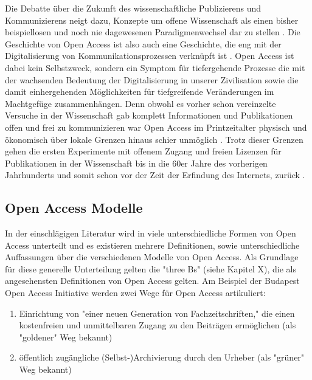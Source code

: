 Die Debatte über die Zukunft des wissenschaftliche Publizierens und Kommunizierens neigt dazu, Konzepte um offene Wissenschaft als einen bisher beispiellosen und noch nie dagewesenen Paradigmenwechsel dar zu stellen \cite{cite:17a} \cite{cite:17b}. Die Geschichte von Open Access ist also auch eine Geschichte, die eng mit der Digitalisierung von Kommunikationsprozessen verknüpft ist \cite{albert_2006_open_implications}. Open Access ist dabei kein Selbstzweck\cite{cite:17d}, sondern ein Symptom für tiefergehende Prozesse die mit der wachsenden Bedeutung der Digitalisierung in unserer Zivilisation sowie die damit einhergehenden Möglichkeiten für tiefgreifende Veränderungen im Machtgefüge zusammenhängen\cite{cite:17e}. Denn obwohl es vorher schon vereinzelte Versuche in der Wissenschaft gab komplett Informationen und Publikationen offen und frei zu kommunizieren war Open Access im Printzeitalter physisch und ökonomisch über lokale Grenzen hinaus schier unmöglich \cite{cite:18a}. Trotz dieser Grenzen gehen die ersten Experimente mit offenem Zugang und freien Lizenzen für Publikationen in der Wissenschaft bis in die 60er Jahre des vorherigen Jahrhunderts und somit schon vor der Zeit der Erfindung des Internets, zurück \cite{cite:18b}. 

\subsection{Open Access Modelle}

In der einschlägigen Literatur wird in viele unterschiedliche Formen von Open Access unterteilt und es existieren mehrere Definitionen\cite{CREATe_2014}\cite{albert_2006_open_implications}, sowie unterschiedliche Auffassungen über die verschiedenen Modelle von Open Access\cite{CREATe_2014}\cite{cite:22b}\cite{lewis_2012_inevitability}. Als Grundlage für diese generelle Unterteilung gelten die "three Bs" (siehe Kapitel X), die als angesehensten Definitionen von Open Access gelten. Am Beispiel der Budapest Open Access Initiative werden zwei Wege für Open Access artikuliert\cite{albert_2006_open_implications}: 
\begin{enumerate}
\item Einrichtung von "einer neuen Generation von Fachzeitschriften," die einen kostenfreien und unmittelbaren Zugang zu den Beiträgen ermöglichen (als "goldener" Weg bekannt)
\item öffentlich zugängliche (Selbst-)Archivierung durch den Urheber (als "grüner" Weg bekannt)
\end{enumerate}

